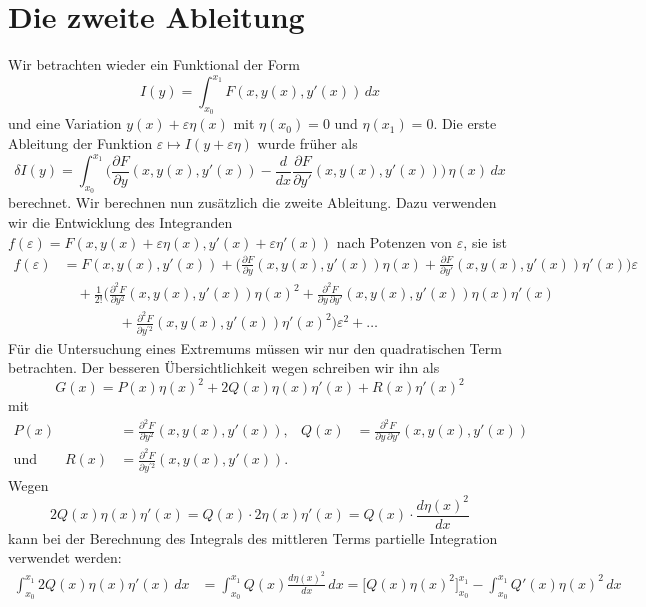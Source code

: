 %
%
%
\section{Die zweite Ableitung
\label{buch:variation2:section:zweiteableitung}}
Wir betrachten wieder ein Funktional der Form
\[
I(y)
=
\int_{x_0}^{x_1}
F(x,y(x),y'(x))
\,dx
\]
und eine Variation $y(x)+\varepsilon\eta(x)$ mit $\eta(x_0)=0$
und $\eta(x_1)=0$.
Die erste Ableitung der Funktion $\varepsilon\mapsto I(y+\varepsilon\eta)$
wurde früher als
\[
\delta I(y)
=
\int_{x_0}^{x_1}
\biggl(
\frac{\partial F}{\partial y}(x,y(x),y'(x))
-
\frac{d}{dx}
\frac{\partial F}{\partial y'}(x,y(x),y'(x))
\biggr)
\,
\eta(x)
\,dx
\]
berechnet.
Wir berechnen nun zusätzlich die zweite Ableitung.
Dazu verwenden wir die Entwicklung des Integranden
$f(\varepsilon) = F(x,y(x)+\varepsilon\eta(x),y'(x)+\varepsilon\eta'(x))$
nach Potenzen von $\varepsilon$, sie ist
\begin{align*}
f(\varepsilon)
&=
F(x,y(x),y'(x))
+
\biggl(
\frac{\partial F}{\partial y}(x,y(x),y'(x))\eta(x)
+
\frac{\partial F}{\partial y'}(x,y(x),y'(x))\eta'(x)
\biggr)
\varepsilon
\\
&\quad
+
\frac{1}{2!}
\biggl(
\frac{\partial^2 F}{\partial y^2}(x,y(x),y'(x))
\eta(x)^2
+
\frac{\partial^2 F}{\partial y\,\partial y'}(x,y(x),y'(x))
\eta(x)\eta'(x)
\\
&\qquad\qquad
+
\frac{\partial^2 F}{\partial y^{\prime 2}}(x,y(x),y'(x))
\eta'(x)^2
\biggr)
\varepsilon^2
+
\dots
\end{align*}
Für die Untersuchung eines Extremums müssen wir nur den quadratischen
Term betrachten.
Der besseren Übersichtlichkeit wegen schreiben wir ihn als
\[
G(x)
=
P(x)\eta(x)^2 + 2Q(x) \eta(x)\eta'(x) + R(x)\eta'(x)^2
\]
mit
\begin{align*}
P(x) &= \frac{\partial^2 F}{\partial y^2} (x,y(x),y'(x)),
&
Q(x) &= \frac{\partial^2 F}{\partial y\,\partial y'} (x,y(x),y'(x))
\\
\text{und}
\qquad
R(x) &= \frac{\partial^2 F}{\partial y^{\prime 2}} (x,y(x),y'(x)).
\end{align*}
Wegen
\[
2Q(x)\eta(x)\eta'(x)
=
Q(x)\cdot 2\eta(x)\eta'(x)
=
Q(x)\cdot \frac{d\eta(x)^2}{dx}
\]
kann bei der Berechnung des Integrals des mittleren Terms partielle
Integration verwendet werden:
\begin{align*}
\int_{x_0}^{x_1}
2Q(x)\eta(x)\eta'(x)
\,dx
&=
\int_{x_0}^{x_1}
Q(x) \frac{d\eta(x)^2}{dx}
\,dx
=
\biggl[Q(x)\eta(x)^2\biggr]_{x_0}^{x_1}
-
\int_{x_0}^{x_1} Q'(x) \eta(x)^2\,dx
\end{align*}
